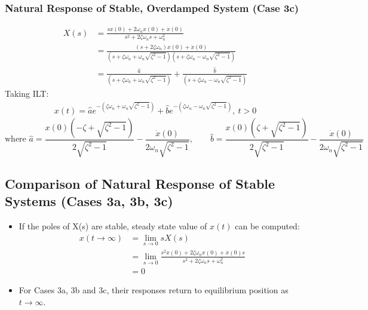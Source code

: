 \documentclass[a4paper]{article}
\begin{document}
\subsubsection{Natural Response of Stable, Overdamped System (Case 3c)}
\begin{align*}
    X(s) &= \frac{sx(0)+2\omega_n x(0)+\dot{x}(0)}{s^2+2\zeta\omega_n s+\omega_n^2}\\
    &= \frac{(s+2\zeta\omega_n)x(0)+\dot{x}(0)}{(s+\zeta\omega_n+\omega_n\sqrt{\zeta^2-1})(s+\zeta\omega_n-\omega_n\sqrt{\zeta^2-1})}\\
    &= \frac{\hat{a}}{(s+\zeta\omega_n+\omega_n\sqrt{\zeta^2-1})}+\frac{\hat{b}}{(s+\zeta\omega_n-\omega_n\sqrt{\zeta^2-1})}
\end{align*}
Taking ILT:
\begin{align*}
    x(t) = \hat{a}e^{-(\zeta\omega_n+\omega_n\sqrt{\zeta^2-1})}+\hat{b}e^{-(\zeta\omega_n-\omega_n\sqrt{\zeta^2-1})},\ t>0
\end{align*}
    $$\text{where }\hat{a} = \frac{x(0)(-\zeta+\sqrt{\zeta^2-1})}{2\sqrt{\zeta^2-1}}-\frac{\dot{x}(0)}{2\omega_n\sqrt{\zeta^2-1}},\qquad\hat{b} = \frac{x(0)(\zeta+\sqrt{\zeta^2-1})}{2\sqrt{\zeta^2-1}}-\frac{\dot{x}(0)}{2\omega_n\sqrt{\zeta^2-1}}$$

\subsection{Comparison of Natural Response of Stable Systems (Cases 3a, 3b, 3c)}
\begin{itemize}
    \item If the poles of X(s) are stable, steady state value of $x(t)$ can be computed:
    \begin{align*}
        x(t\to\infty) &= \lim_{s\to 0} sX(s)\\
        &= \lim_{s\to 0}\frac{s^2x(0)+2\zeta\omega_n x(0)+\dot{x}(0)s}{s^2+2\zeta\omega_n s+\omega_n^2}\\
        &= 0
    \end{align*}
    \item For Cases 3a, 3b and 3c, their responses return to equilibrium position as $t\to \infty$.
\end{itemize}
\end{document}

